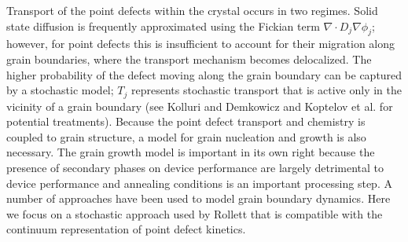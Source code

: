 \documentclass[11pt]{article}
\newcommand{\MarginPar}[1]{\marginpar{%
\vskip-\baselineskip %
\raggedright\tiny\sffamily
\hrule\smallskip{\color{red}#1}\par\smallskip\hrule}}
\begin{document}
Transport of the point defects within the crystal occurs in two
regimes. Solid state diffusion is frequently approximated using the
Fickian term $\nabla\cdot D_j \nabla \phi_j$;
however, for point defects this is insufficient to account for their
migration along grain boundaries, where the
transport mechanism becomes delocalized. The higher
probability of the defect moving along the grain boundary can be
captured by a stochastic model; $T_j$ represents stochastic transport
that is active only in the vicinity of a grain boundary (see  Kolluri and
Demkowicz \cite{Kolluri12} and Koptelov et al. \cite{Koptelov84} for  potential treatments). 
%
Because the point defect transport and chemistry is coupled to grain structure, a model
for grain nucleation and growth is also necessary.
The grain growth model is important in its own right because the
presence of secondary phases on device performance are largely detrimental to device
performance \cite{Flammersberger} and annealing conditions is an important processing step.
A number of approaches have been used to model grain boundary
dynamics.  Here we focus on a stochastic approach 
used by Rollett \cite{Rollett04} that is compatible with the continuum representation of point defect kinetics. 
\end{document}
